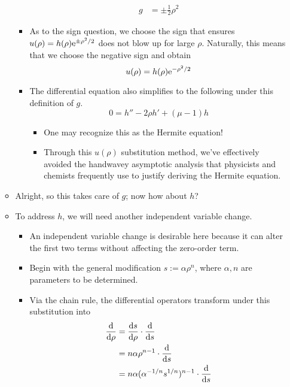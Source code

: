 \documentclass[../finalProject.tex]{subfiles}
\begin{document}
\begin{itemize}
\begin{itemize}
\begin{itemize}
\begin{align*}
                g &= \pm\frac{1}{2}\rho^2
            \end{align*}
            \item As to the sign question, we choose the sign that ensures $u(\rho)=h(\rho)\e[\pm\rho^2/2]$ does not blow up for large $\rho$. Naturally, this means that we choose the negative sign and obtain
            \begin{equation*}
                u(\rho) = h(\rho)\e[-\rho^2/2]
            \end{equation*}
            \item The differential equation also simplifies to the following under this definition of $g$.
            \begin{equation*}
                0 = h''-2\rho h'+(\mu-1)h
            \end{equation*}
            \begin{itemize}
                \item One may recognize this as the Hermite equation!
                \item Through this $u(\rho)$ substitution method, we've effectively avoided the handwavey asymptotic analysis that physicists and chemists frequently use to justify deriving the Hermite equation.
            \end{itemize}
        \end{itemize}
        \item Alright, so this takes care of $g$; now how about $h$?
        \item To address $h$, we will need another independent variable change.
        \begin{itemize}
            \item An independent variable change is desirable here because it can alter the first two terms without affecting the zero-order term.
            \item Begin with the general modification $s:=\alpha\rho^n$, where $\alpha,n$ are parameters to be determined.
            \item Via the chain rule, the differential operators transform under this substitution into
            \begin{align*}
                \dv{\rho} &= \dv{s}{\rho}\cdot\dv{s}\\
                &= n\alpha\rho^{n-1}\cdot\dv{s}\\
                &= n\alpha(\alpha^{-1/n}s^{1/n})^{n-1}\cdot\dv{s}\\

\end{align*}
\end{itemize}
\end{itemize}
\end{itemize}
\end{document}
